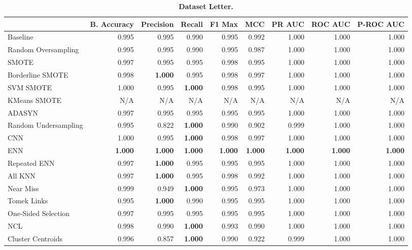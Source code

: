 \begin{table}[H]
    \centering
    \setlength\tabcolsep{2pt}
    \begin{tabularx}{\textwidth}{lRRRRRRRR}
        & B. Accuracy & Precision & Recall & F1 Max & MCC & PR AUC & ROC AUC & P-ROC AUC \\
        \midrule
        Baseline & 0.995 & 0.995 & 0.990 & 0.995 & 0.992 & 1.000 & 1.000 & 1.000 \\
        Random Oversampling & 0.995 & 0.995 & 0.990 & 0.995 & 0.987 & 1.000 & 1.000 & 1.000 \\
        SMOTE & 0.997 & 0.995 & 0.995 & 0.998 & 0.995 & 1.000 & 1.000 & 1.000 \\
        Borderline SMOTE & 0.998 & \textbf{1.000} & 0.995 & 0.998 & 0.997 & 1.000 & 1.000 & 1.000 \\
        SVM SMOTE & 1.000 & 0.995 & \textbf{1.000} & 0.998 & 0.995 & 1.000 & 1.000 & 1.000 \\
        KMeans SMOTE & N/A & N/A & N/A & N/A & N/A & N/A & N/A & N/A \\
        ADASYN & 0.997 & 0.995 & 0.995 & 0.995 & 0.995 & 1.000 & 1.000 & 1.000 \\
        Random Undersampling & 0.995 & 0.822 & \textbf{1.000} & 0.990 & 0.902 & 0.999 & 1.000 & 1.000 \\
        CNN & 1.000 & 0.995 & \textbf{1.000} & 0.998 & 0.997 & 1.000 & 1.000 & 1.000 \\
        ENN & \textbf{1.000} & \textbf{1.000} & \textbf{1.000} & \textbf{1.000} & \textbf{1.000} & \textbf{1.000} & \textbf{1.000} & \textbf{1.000} \\
        Repeated ENN & 0.997 & \textbf{1.000} & 0.995 & 0.995 & 0.995 & 1.000 & 1.000 & 1.000 \\
        All KNN & 0.997 & \textbf{1.000} & 0.995 & 0.998 & 0.992 & 1.000 & 1.000 & 1.000 \\
        Near Miss & 0.999 & 0.949 & \textbf{1.000} & 0.995 & 0.973 & 1.000 & 1.000 & 1.000 \\
        Tomek Links & 0.995 & \textbf{1.000} & 0.990 & 0.995 & 0.995 & 1.000 & 1.000 & 1.000 \\
        One-Sided Selection & 0.997 & 0.995 & 0.995 & 0.995 & 0.995 & 1.000 & 1.000 & 1.000 \\
        NCL & 0.998 & 0.990 & \textbf{1.000} & 0.993 & 0.990 & 1.000 & 1.000 & 1.000 \\
        Cluster Centroids & 0.996 & 0.857 & \textbf{1.000} & 0.990 & 0.922 & 0.999 & 1.000 & 1.000 \\
    \end{tabularx}
    \vspace{1mm}
    \caption{\textbf{Dataset Letter.}}
\end{table}
